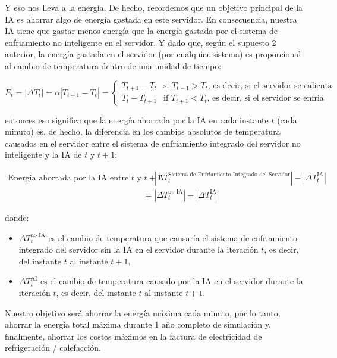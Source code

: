 \documentclass[]{book}
\providecommand{\tightlist}{%
  \setlength{\itemsep}{0pt}\setlength{\parskip}{0pt}}
\begin{document}
Y eso nos lleva a la energía. De hecho, recordemos que un objetivo principal de la IA es ahorrar algo de energía gastada en este servidor. En consecuencia, nuestra IA tiene que gastar menos energía que la energía gastada por el sistema de enfriamiento no inteligente en el servidor. Y dado que, según el supuesto 2 anterior, la energía gastada en el servidor (por cualquier sistema) es proporcional al cambio de temperatura dentro de una unidad de tiempo:

\begin{equation*}
E_t = |\Delta T_t| = \alpha |T_{t+1} - T_t| =
\begin{cases}
T_{t+1} - T_t & \textrm{si $T_{t+1} > T_t$, es decir, si el servidor se calienta} \\
T_t - T_{t+1} & \textrm{if $T_{t+1} < T_t$, es decir, si el servidor se enfria}
\end{cases}
\end{equation*}

entonces eso significa que la energía ahorrada por la IA en cada instante \(t\) (cada minuto) es, de hecho, la diferencia en los cambios absolutos de temperatura causados en el servidor entre el sistema de enfriamiento integrado del servidor no inteligente y la IA de \(t\) y \(t + 1\):

\begin{align*}
        \textrm{Energia ahorrada por la IA entre $t$ y $t+1$}
        & = |\Delta T_t^{\textrm{Sistema de Enfriamiento Integrado del Servidor}}| - |\Delta T_t^{\textrm{IA}}| \\
        & = |\Delta T_t^{\textrm{no IA}}| - |\Delta T_t^{\textrm{IA}}|
\end{align*}

donde:

\begin{itemize}
\tightlist
\item
  \(\Delta T_t^{\textrm{no IA}}\) es el cambio de temperatura que causaría el sistema de enfriamiento integrado del servidor sin la IA en el servidor durante la iteración \(t\), es decir, del instante \(t\) al instante \(t + 1\),
\item
  \(\Delta T_t^{\textrm{AI}}\) es el cambio de temperatura causado por la IA en el servidor durante la iteración \(t\), es decir, del instante \(t\) al instante \(t + 1\).
\end{itemize}

Nuestro objetivo será ahorrar la energía máxima cada minuto, por lo tanto, ahorrar la energía total máxima durante 1 año completo de simulación y, finalmente, ahorrar los costos máximos en la factura de electricidad de refrigeración / calefacción.
\end{document}
